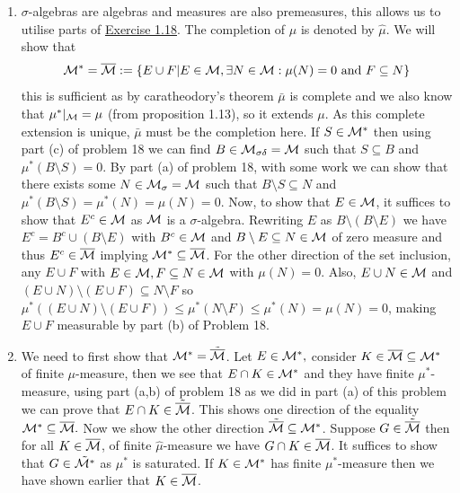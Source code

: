 \documentclass[12pt,a4paper]{article}
\begin{document}
\begin{solution}
    \begin{enumerate}[label=\alph*.]
        \item $\sigma$-algebras are algebras and measures are also premeasures, this allows us to utilise parts of \hyperref[prob:1-18]{Exercise 1.18}. 
        The completion of $\mu$ is denoted by $\hat{\mu}$. 
        We will show that 
        $$\mathcal{M}^*=\overline{\mathcal{M}}:=\{E\cup F|E\in\mathcal{M},\exists N\in\mathcal{M}:\mu(N)=0\text{ and }F\subseteq N\}$$ 
        this is sufficient as by caratheodory's theorem $\bar{\mu}$ is complete and we also know that $\mu^*|_{\mathcal{M}}=\mu$ (from proposition 1.13), so it extends $\mu$. 
        As this complete extension is unique, $\bar{\mu}$ must be the completion here. 
        If $S\in\mathcal{M}^*$ then using part (c) of problem 18 we can find $B\in\mathcal{M}_{\sigma\delta}=\mathcal{M}$ such that $S\subseteq B$ and $\mu^*(B\setminus S)=0$.
        By part (a) of problem 18, with some work we can show that there exists some $N\in\mathcal{M}_\sigma=\mathcal{M}$ such that $B\setminus S\subseteq N$ and $\mu^*(B\setminus S)=\mu^*(N)=\mu(N)=0$. 
        Now, to show that $E\in\mathcal{M}$, it suffices to show that $E^c\in\mathcal{M}$ as $\mathcal{M}$ is a $\sigma$-algebra.
        Rewriting $E$ as $B\setminus(B\setminus E)$ we have $E^c=B^c\cup(B\setminus E)$ with $B^c\in\mathcal{M}$ and $B\setminus E\subseteq N\in\mathcal{M}$ of zero measure and thus $E^c\in\overline{\mathcal{M}}$ implying $\mathcal{M}^*\subseteq\overline{\mathcal{M}}$.
        For the other direction of the set inclusion, any $E\cup F$ with $E\in\mathcal{M},F\subseteq N\in\mathcal{M}$ with $\mu(N)=0$. 
        Also, $E\cup N\in\mathcal{M}$ and $(E\cup N)\setminus(E\cup F)\subseteq N\setminus F$ so $\mu^*((E\cup N)\setminus(E\cup F))\leq\mu^*(N\setminus F)\leq\mu^*(N)=\mu(N)=0$, making $E\cup F$ measurable by part (b) of Problem 18.
        \item We need to first show that $\mathcal{M}^*=\tilde{\overline{\mathcal{M}}}$. 
        Let $E\in\mathcal{M}^*,$ consider $K\in\overline{\mathcal{M}}\subseteq\mathcal{M}^*$ of finite $\mu$-measure, then we see that $E\cap K\in\mathcal{M}^*$ and they have finite $\mu^*$-measure, using part (a,b) of problem 18 as we did in part (a) of this problem we can prove that $E\cap K\in\tilde{\overline{\mathcal{M}}}$.
        This shows one direction of the equality $\mathcal{M}^*\subseteq\overline{\mathcal{M}}.$ 
        Now we show the other direction $\tilde{\overline{\mathcal{M}}}\subseteq\mathcal{M}^*$. 
        Suppose $G\in\tilde{\overline{\mathcal{M}}}$ then for all $K\in\overline{\mathcal{M}}$, of finite $\hat{\mu}$-measure we have $G\cap K\in\overline{\mathcal{M}}$. 
        It suffices to show that $G\in\tilde{\mathcal{M}^*}$ as $\mu^*$ is saturated. 
        If $K\in\mathcal{M}^*$ has finite $\mu^*$-measure then we have shown earlier that $K\in\overline{\mathcal{M}}$.

\end{enumerate}
\end{solution}
\end{document}
